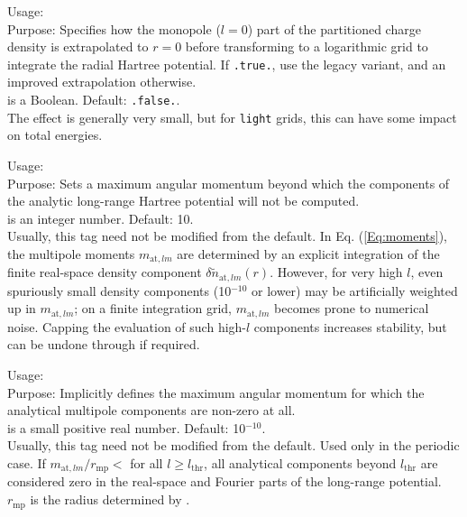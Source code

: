 {
  \noindent
  Usage:   \\[1.0ex]
  Purpose: Specifies how the monopole ($l=0$) part of the partitioned charge
  density is extrapolated to $r=0$ before transforming to a logarithmic grid
  to integrate the radial Hartree potential.  If \texttt{.true.}, use the
  legacy variant, and an improved extrapolation otherwise.
  \\[1.0ex]
   is a Boolean.  Default: \texttt{.false.}.\\%
}%
The effect is generally very small, but for \texttt{light} grids, this can
have some impact on total energies.


{
  \noindent
  Usage:   \\[1.0ex]
  Purpose: Sets a maximum angular momentum beyond which the components of the
  analytic long-range Hartree potential will not be computed. \\[1.0ex]
   is an integer number. Default: 10. \\
}
Usually, this tag need not be modified from the default. In
Eq. (\ref{Eq:moments}), the multipole moments $m_{\text{at},lm}$ are
determined by an explicit integration of the finite real-space density
component $\delta\tilde{n}_{\text{at},lm}(r)$. However, for very high $l$,
even spuriously small density components (10$^{-10}$ or lower) may be
artificially weighted up in $m_{\text{at},lm}$; on a finite integration grid,
$m_{\text{at},lm}$ becomes prone to numerical noise. Capping the evaluation of
such high-$l$ components increases stability, but can be undone through
   if required.

{
  \noindent
  Usage:   \\[1.0ex]
  Purpose: Implicitly defines the maximum angular momentum for which
    the analytical multipole components are non-zero at all. \\[1.0ex]
   is a small positive real number. Default:
  10$^{-10}$. \\
}
Usually, this tag need not be modified from the default. Used only in
the periodic case. If $m_{\text{at},lm}/r_\text{mp}<$ for all
$l\ge l_\text{thr}$, all analytical components beyond $l_\text{thr}$
are considered zero in the real-space and Fourier parts of the
long-range potential. $r_\text{mp}$ is the radius determined by
. 

